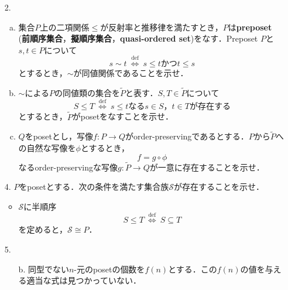 \documentclass[xelatex,ja=standard,a4paper,14pt,everyparhook=compat]{bxjsarticle}
\theoremstyle{definition}
\begin{document}
\begin{enumerate}
    \item[2.] \begin{enumerate}[a.]
              \item 集合$P$上の二項関係$\leq$が反射率と推移律を満たすとき，$P$は\textbf{preposet} (\textbf{前順序集合}，\textbf{擬順序集合}，\textbf{quasi-ordered set})をなす．Preposet $P$と$s,t \in P$について \begin{equation*}
                        s \sim t \ \overset{\mathrm{def}}{\Longleftrightarrow} \ s \leq t \text{かつ} t \leq s
                    \end{equation*}
                    とするとき，$\sim$が同値関係であることを示せ．
              \item $\sim$による$P$の同値類の集合を$\widetilde P$と表す．$S, T \in \widetilde P$について \begin{equation*}
                  S \leq T \ \overset{\mathrm{def}}{\Longleftrightarrow} \ \text{$s \leq t$なる$s \in S$，$t \in T$が存在する}
              \end{equation*}
              とするとき，$\widetilde P$がposetをなすことを示せ．
              \item $Q$をposetとし，写像$f \colon P \to Q$がorder-preservingであるとする．$P$から$\widetilde P$への自然な写像を$\phi$とするとき， \begin{equation*}
                  f = g \circ \phi
              \end{equation*}
              なるorder-preservingな写像$g \colon \widetilde P \to Q$が一意に存在することを示せ．
          \end{enumerate}
    \item[4.] $P$をposetとする．次の条件を満たす集合族$\mathcal{S}$が存在することを示せ． \begin{itemize}
              \item $\mathcal{S}$に半順序 \begin{equation*}
                        S \leq T \ \overset{\mathrm{def}}{\Longleftrightarrow} \ S \subseteq T
                    \end{equation*}
                    を定めると，$\mathcal{S} \cong P$．
          \end{itemize}
    \item[5.] \begin{enumerate}
              \item[b.] 同型でない$n$-元のposetの個数を$f(n)$とする．この$f(n)$の値を与える適当な式は見つかっていない．

\end{enumerate}
\end{enumerate}
\end{document}
